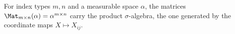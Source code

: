 For index types $m,n$ and a measurable space $\alpha$, the matrices $\Mat_{m\times n}(\alpha)=\alpha^{m\times n}$ carry the product $\sigma$-algebra, the one generated by the coordinate maps $X\mapsto X_{ij}$.
